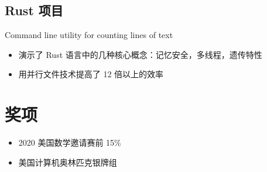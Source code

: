 \documentclass{article}
\begin{document}
\subsection*{Rust 项目} Command line utility for counting lines of text
\begin{itemize}
  \item 演示了 Rust 语言中的几种核心概念：记忆安全，多线程，遗传特性

  \item 用并行文件技术提高了 12 倍以上的效率
\end{itemize}

\section*{奖项}

\begin{itemize}
  \item 2020 美国数学邀请赛前 15\%

  \item 美国计算机奥林匹克银牌组
\end{itemize}




\end{document}
